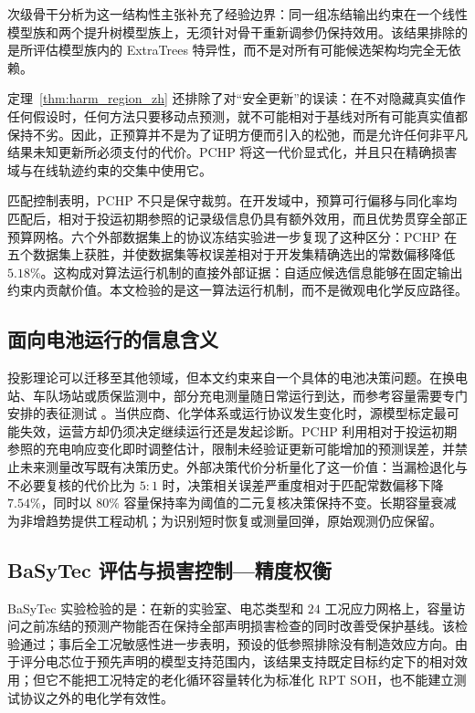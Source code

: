 \documentclass[UTF8,11pt]{ctexart}
\begin{document}
次级骨干分析为这一结构性主张补充了经验边界：同一组冻结输出约束在一个线性模型族和两个提升树模型族上，无须针对骨干重新调参仍保持效用。该结果排除的是所评估模型族内的 ExtraTrees 特异性，而不是对所有可能候选架构均完全无依赖。

定理~\ref{thm:harm_region_zh} 还排除了对“安全更新”的误读：在不对隐藏真实值作任何假设时，任何方法只要移动点预测，就不可能相对于基线对所有可能真实值都保持不劣。因此，正预算并不是为了证明方便而引入的松弛，而是允许任何非平凡结果未知更新所必须支付的代价。PCHP 将这一代价显式化，并且只在精确损害域与在线轨迹约束的交集中使用它。

匹配控制表明，PCHP 不只是保守裁剪。在开发域中，预算可行偏移与同化率均匹配后，相对于投运初期参照的记录级信息仍具有额外效用，而且优势贯穿全部正预算网格。六个外部数据集上的协议冻结实验进一步复现了这种区分：PCHP 在五个数据集上获胜，并使数据集等权误差相对于开发集精确选出的常数偏移降低 $5.18\%$。这构成对算法运行机制的直接外部证据：自适应候选信息能够在固定输出约束内贡献价值。本文检验的是这一算法运行机制，而不是微观电化学反应路径。

\subsection{面向电池运行的信息含义}

投影理论可以迁移至其他领域，但本文约束来自一个具体的电池决策问题。在换电站、车队场站或质保监测中，部分充电测量随日常运行到达，而参考容量需要专门安排的表征测试 \citep{liu2023rapid,zhang2024flexible}。当供应商、化学体系或运行协议发生变化时，源模型标定最可能失效，运营方却仍须决定继续运行还是发起诊断。PCHP 利用相对于投运初期参照的充电响应变化即时调整估计，限制未经验证更新可能增加的预测误差，并禁止未来测量改写既有决策历史。外部决策代价分析量化了这一价值：当漏检退化与不必要复核的代价比为 $5{:}1$ 时，决策相关误差严重度相对于匹配常数偏移下降 $7.54\%$，同时以 $80\%$ 容量保持率为阈值的二元复核决策保持不变。长期容量衰减为非增趋势提供工程动机；为识别短时恢复或测量回弹，原始观测仍应保留。

\subsection{BaSyTec 评估与损害控制—精度权衡}

BaSyTec 实验检验的是：在新的实验室、电芯类型和 $24$ 工况应力网格上，容量访问之前冻结的预测产物能否在保持全部声明损害检查的同时改善受保护基线。该检验通过；事后全工况敏感性进一步表明，预设的低参照排除没有制造效应方向。由于评分电芯位于预先声明的模型支持范围内，该结果支持既定目标约定下的相对效用；但它不能把工况特定的老化循环容量转化为标准化 RPT SOH，也不能建立测试协议之外的电化学有效性。
\end{document}
